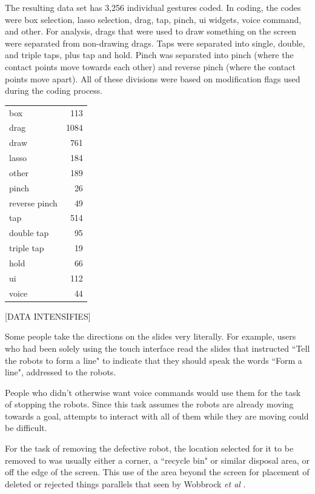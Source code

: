 The resulting data set has 3,256 individual gestures coded. 
In coding, the codes were box selection, lasso selection, drag, tap, pinch, ui widgets, voice command, and other. 
For analysis, drags that were used to draw something on the screen were separated from non-drawing drags. 
Taps were separated into single, double, and triple taps, plus tap and hold. 
Pinch was separated into pinch (where the contact points move towards each other) and reverse pinch (where the contact points move apart).
All of these divisions were based on modification flags used during the coding process.  

\begin{tabular}{l r}
box & 113 \\
drag & 1084 \\
draw & 761 \\
lasso & 184 \\
other & 189 \\
pinch & 26 \\
reverse pinch & 49 \\
tap & 514 \\
double tap & 95 \\
triple tap & 19 \\
hold & 66 \\
ui & 112 \\
voice & 44 \\
\end{tabular}


[DATA INTENSIFIES]
 
Some people  take the directions on the slides very literally. 
For example, users who had been solely using the touch interface read the slides that instructed ``Tell the robots to form a line" to indicate that they should speak the words ``Form a line", addressed to the robots.

People  who didn't otherwise want voice commands would use them for the task of stopping the robots. 
Since this task assumes the robots are already moving towards a goal, attempts to interact with all of them while they are moving could be difficult. 

For the task of removing the defective robot, the location selected for it to be removed to was usually either a corner, a ``recycle bin" or similar disposal area, or off the edge of the screen. This use of the area beyond the screen for placement of deleted or rejected things parallels that seen by Wobbrock \textit{et al} \citep{wobbrock2009user}.

